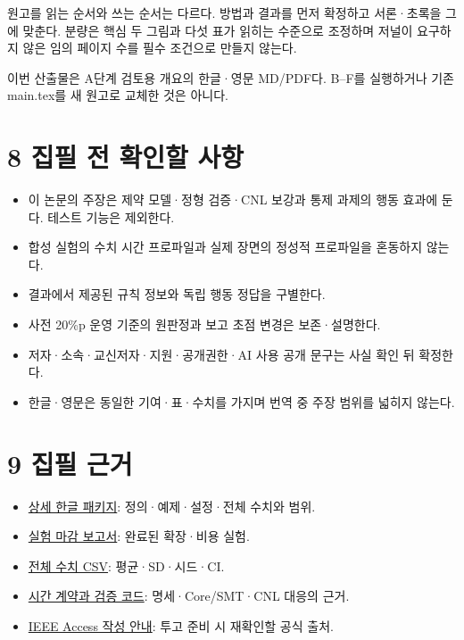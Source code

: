 \documentclass[11pt,a4paper]{article}
\begin{document}
원고를 읽는 순서와 쓰는 순서는 다르다. 방법과 결과를 먼저 확정하고 서론·초록을 그에 맞춘다. 분량은 핵심 두 그림과 다섯 표가 읽히는 수준으로 조정하며 저널이 요구하지 않은 임의 페이지 수를 필수 조건으로 만들지 않는다.\par

이번 산출물은 A단계 검토용 개요의 한글·영문 MD/PDF다. B–F를 실행하거나 기존 main.tex를 새 원고로 교체한 것은 아니다.\par

\section*{8 집필 전 확인할 사항}

\begin{itemize}
\item 이 논문의 주장은 제약 모델·정형 검증·CNL 보강과 통제 과제의 행동 효과에 둔다. 테스트 기능은 제외한다.
\item 합성 실험의 수치 시간 프로파일과 실제 장면의 정성적 프로파일을 혼동하지 않는다.
\item 결과에서 제공된 규칙 정보와 독립 행동 정답을 구별한다.
\item 사전 20\%p 운영 기준의 원판정과 보고 초점 변경은 보존·설명한다.
\item 저자·소속·교신저자·지원·공개권한·AI 사용 공개 문구는 사실 확인 뒤 확정한다.
\item 한글·영문은 동일한 기여·표·수치를 가지며 번역 중 주장 범위를 넓히지 않는다.
\end{itemize}

\section*{9 집필 근거}

\begin{itemize}
\item \href{\detokenize{../../../../../../projects/04-guardsynth-coc/paper/GUARDSYNTH_COC_METHODS_SETTINGS_PACKAGE_V01_KO.md}}{상세 한글 패키지}: 정의·예제·설정·전체 수치와 범위.
\item \href{\detokenize{../temporal-experiment-closure-2026-09-29-001/REPORT_KO.md}}{실험 마감 보고서}: 완료된 확장·비용 실험.
\item \href{\detokenize{../temporal-experiment-closure-2026-09-29-001/all_primary_metrics.csv}}{전체 수치 CSV}: 평균·SD·시드·CI.
\item \href{\detokenize{../../../../../../projects/04-guardsynth-coc/experiments/paper1_cnl_learning/temporal_preservation.py}}{시간 계약과 검증 코드}: 명세·Core/SMT·CNL 대응의 근거.
\item \href{\detokenize{https://ieeeaccess.ieee.org/authors/preparing-your-article/}}{IEEE Access 작성 안내}: 투고 준비 시 재확인할 공식 출처.
\end{itemize}
\end{document}
